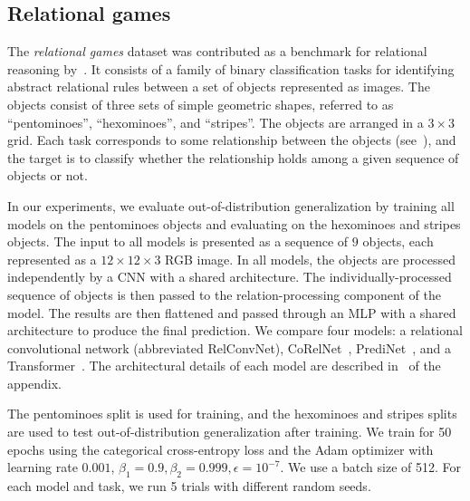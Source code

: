 \subsection{Relational games}

The \textit{relational games} dataset was contributed as a benchmark for relational reasoning by~\citep{shanahanExplicitlyRelationalNeural}. It consists of a family of binary classification tasks for identifying abstract relational rules between a set of objects represented as images. The objects consist of three sets of simple geometric shapes, referred to as ``pentominoes'', ``hexominoes'', and ``stripes''. The objects are arranged in a $3 \times 3$ grid. Each task corresponds to some relationship between the objects (see~), and the target is to classify whether the relationship holds among a given sequence of objects or not.

In our experiments, we evaluate out-of-distribution generalization by training all models on the pentominoes objects and evaluating on the hexominoes and stripes objects. The input to all models is presented as a sequence of $9$ objects, each represented as a $12 \times 12 \times 3$ RGB image. In all models, the objects are processed independently by a CNN with a shared architecture. The individually-processed sequence of objects is then passed to the relation-processing component of the model. The results are then flattened and passed through an MLP with a shared architecture to produce the final prediction. We compare four models: a relational convolutional network (abbreviated RelConvNet), CoRelNet~\citep{kergNeuralArchitecture2022}, PrediNet~\citep{shanahanExplicitlyRelationalNeural}, and a Transformer~\citep{vaswani2017attention}. The architectural details of each model are described in~ of the appendix.

The pentominoes split is used for training,
and the hexominoes and stripes splits are used to test out-of-distribution generalization after training. We train for 50 epochs using the categorical cross-entropy loss and the Adam optimizer with learning rate $0.001$, $\beta_1 = 0.9, \beta_2 = 0.999, \epsilon = 10^{-7}$. We use a batch size of 512. For each model and task, we run 5 trials with different random seeds.

